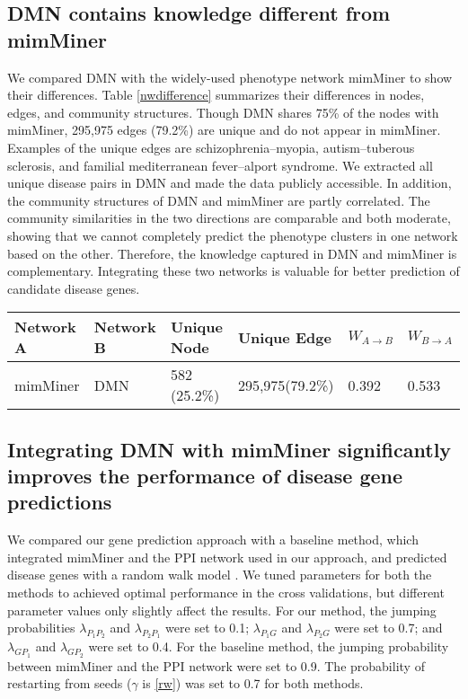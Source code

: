 \subsection{DMN contains knowledge different from mimMiner}
We compared DMN with the widely-used phenotype network mimMiner to show their differences.
Table \ref{nwdifference} summarizes their differences in nodes, edges, and community structures.
Though DMN shares 75\% of the nodes with mimMiner, 295,975 edges (79.2\%) are unique and do not appear in mimMiner. Examples of the unique edges are
schizophrenia--myopia, autism--tuberous sclerosis, and familial mediterranean fever--alport syndrome.
We extracted all unique disease pairs in DMN and made the data publicly accessible.
In addition, the community structures of DMN and mimMiner are partly correlated.
The community similarities in the two directions are comparable and both moderate,
showing that we cannot completely predict the phenotype clusters in one network based on the other.
Therefore, the knowledge captured in DMN and mimMiner is complementary. Integrating these two networks is valuable for better prediction of candidate disease genes.
\begin{table*}[h!]
\caption{Compare DMN with mimMiner in nodes, edges and community structures. \label{nwdifference}}
\vspace{0.3cm}
\begin{tabular}{llllll}
\hline
Network A	&Network B	&Unique Node	&Unique Edge	& $W_{A \to B}$ &	$W_{B \to A}$\\\hline
mimMiner	&DMN	    &582 (25.2\%)	&295,975(79.2\%)	&0.392	     &0.533\\\hline
\end{tabular}
\end{table*}

\subsection{Integrating DMN with mimMiner significantly
improves the performance of disease gene predictions}
We compared our gene prediction approach with a baseline method,
which integrated mimMiner and the PPI network used in our approach,
and predicted disease genes with a random walk model \cite{li2010genome}.
We tuned parameters for both the methods
to achieved optimal performance in the cross validations,
but different parameter values only slightly affect the results.
For our method, the jumping probabilities
${\lambda _{{P_1}{P_2}}}$ and ${\lambda _{{P_2}{P_1}}}$ were set to 0.1;
${\lambda _{{P_1}{G}}}$ and ${\lambda _{{P_2}{G}}}$ were set to 0.7;
and ${\lambda _{{G}{P_1}}}$ and ${\lambda _{{G}{P_2}}}$ were set to 0.4.
For the baseline method, the jumping probability between mimMiner
and the PPI network were set to 0.9.
The probability of restarting from seeds ($\gamma$ is \eqref{rw})
was set to 0.7 for both methods.

